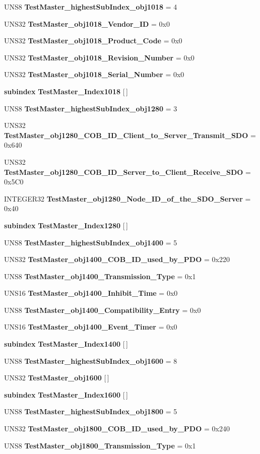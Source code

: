 \begin{CompactItemize}
UNS8 {\bf Test\-Master\_\-highest\-Sub\-Index\_\-obj1018} = 4
\item 
UNS32 {\bf Test\-Master\_\-obj1018\_\-Vendor\_\-ID} = 0x0
\item 
UNS32 {\bf Test\-Master\_\-obj1018\_\-Product\_\-Code} = 0x0
\item 
UNS32 {\bf Test\-Master\_\-obj1018\_\-Revision\_\-Number} = 0x0
\item 
UNS32 {\bf Test\-Master\_\-obj1018\_\-Serial\_\-Number} = 0x0
\item 
{\bf subindex} {\bf Test\-Master\_\-Index1018} [$\,$]
\item 
UNS8 {\bf Test\-Master\_\-highest\-Sub\-Index\_\-obj1280} = 3
\item 
UNS32 {\bf Test\-Master\_\-obj1280\_\-COB\_\-ID\_\-Client\_\-to\_\-Server\_\-Transmit\_\-SDO} = 0x640
\item 
UNS32 {\bf Test\-Master\_\-obj1280\_\-COB\_\-ID\_\-Server\_\-to\_\-Client\_\-Receive\_\-SDO} = 0x5C0
\item 
INTEGER32 {\bf Test\-Master\_\-obj1280\_\-Node\_\-ID\_\-of\_\-the\_\-SDO\_\-Server} = 0x40
\item 
{\bf subindex} {\bf Test\-Master\_\-Index1280} [$\,$]
\item 
UNS8 {\bf Test\-Master\_\-highest\-Sub\-Index\_\-obj1400} = 5
\item 
UNS32 {\bf Test\-Master\_\-obj1400\_\-COB\_\-ID\_\-used\_\-by\_\-PDO} = 0x220
\item 
UNS8 {\bf Test\-Master\_\-obj1400\_\-Transmission\_\-Type} = 0x1
\item 
UNS16 {\bf Test\-Master\_\-obj1400\_\-Inhibit\_\-Time} = 0x0
\item 
UNS8 {\bf Test\-Master\_\-obj1400\_\-Compatibility\_\-Entry} = 0x0
\item 
UNS16 {\bf Test\-Master\_\-obj1400\_\-Event\_\-Timer} = 0x0
\item 
{\bf subindex} {\bf Test\-Master\_\-Index1400} [$\,$]
\item 
UNS8 {\bf Test\-Master\_\-highest\-Sub\-Index\_\-obj1600} = 8
\item 
UNS32 {\bf Test\-Master\_\-obj1600} [$\,$]
\item 
{\bf subindex} {\bf Test\-Master\_\-Index1600} [$\,$]
\item 
UNS8 {\bf Test\-Master\_\-highest\-Sub\-Index\_\-obj1800} = 5
\item 
UNS32 {\bf Test\-Master\_\-obj1800\_\-COB\_\-ID\_\-used\_\-by\_\-PDO} = 0x240
\item 
UNS8 {\bf Test\-Master\_\-obj1800\_\-Transmission\_\-Type} = 0x1

\end{CompactItemize}
